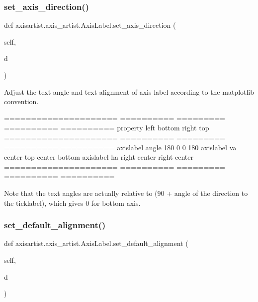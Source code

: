 \mbox{\label{classaxisartist_1_1axis__artist_1_1AxisLabel_a596fc237f415f34c98ec9ce801a7d436}} 
\subsubsection{\texorpdfstring{set\+\_\+axis\+\_\+direction()}{set\_axis\_direction()}}
{\footnotesize\ttfamily def axisartist.\+axis\+\_\+artist.\+Axis\+Label.\+set\+\_\+axis\+\_\+direction (\begin{DoxyParamCaption}\item[{}]{self,  }\item[{}]{d }\end{DoxyParamCaption})}

\begin{DoxyVerb}Adjust the text angle and text alignment of axis label
according to the matplotlib convention.

=====================    ========== ========= ========== ==========
property                 left       bottom    right      top
=====================    ========== ========= ========== ==========
axislabel angle          180        0         0          180
axislabel va             center     top       center     bottom
axislabel ha             right      center    right      center
=====================    ========== ========= ========== ==========

Note that the text angles are actually relative to (90 + angle
of the direction to the ticklabel), which gives 0 for bottom
axis.
\end{DoxyVerb}
 \mbox{\label{classaxisartist_1_1axis__artist_1_1AxisLabel_a9b01fbb991546b21517860fc78508963}} 
\subsubsection{\texorpdfstring{set\+\_\+default\+\_\+alignment()}{set\_default\_alignment()}}
{\footnotesize\ttfamily def axisartist.\+axis\+\_\+artist.\+Axis\+Label.\+set\+\_\+default\+\_\+alignment (\begin{DoxyParamCaption}\item[{}]{self,  }\item[{}]{d }\end{DoxyParamCaption})}

